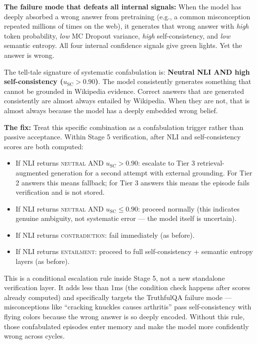 \documentclass[12pt,a4paper]{article}
\theoremstyle{definition}
\begin{document}
\begin{keyinsightbox}
\textbf{The failure mode that defeats all internal signals:} When the model has deeply absorbed a wrong answer from pretraining (e.g., a common misconception repeated millions of times on the web), it generates that wrong answer with \textit{high} token probability, \textit{low} MC Dropout variance, \textit{high} self-consistency, and \textit{low} semantic entropy. All four internal confidence signals give green lights. Yet the answer is wrong.

The tell-tale signature of systematic confabulation is: \textbf{Neutral NLI AND high self-consistency ($u_{\text{SC}} > 0.90$)}. The model consistently generates something that cannot be grounded in Wikipedia evidence. Correct answers that are generated consistently are almost always entailed by Wikipedia. When they are not, that is almost always because the model has a deeply embedded wrong belief.

\textbf{The fix:} Treat this specific combination as a confabulation trigger rather than passive acceptance. Within Stage 5 verification, after NLI and self-consistency scores are both computed:
\begin{itemize}
    \item If NLI returns \textsc{neutral} AND $u_{\text{SC}} > 0.90$: escalate to Tier 3 retrieval-augmented generation for a second attempt with external grounding. For Tier 2 answers this means fallback; for Tier 3 answers this means the episode fails verification and is not stored.
    \item If NLI returns \textsc{neutral} AND $u_{\text{SC}} \leq 0.90$: proceed normally (this indicates genuine ambiguity, not systematic error — the model itself is uncertain).
    \item If NLI returns \textsc{contradiction}: fail immediately (as before).
    \item If NLI returns \textsc{entailment}: proceed to full self-consistency + semantic entropy layers (as before).
\end{itemize}

This is a conditional escalation rule inside Stage 5, not a new standalone verification layer. It adds less than 1ms (the condition check happens after scores already computed) and specifically targets the TruthfulQA failure mode — misconceptions like ``cracking knuckles causes arthritis'' pass self-consistency with flying colors because the wrong answer is so deeply encoded. Without this rule, those confabulated episodes enter memory and make the model more confidently wrong across cycles.
\end{keyinsightbox}
\end{document}
